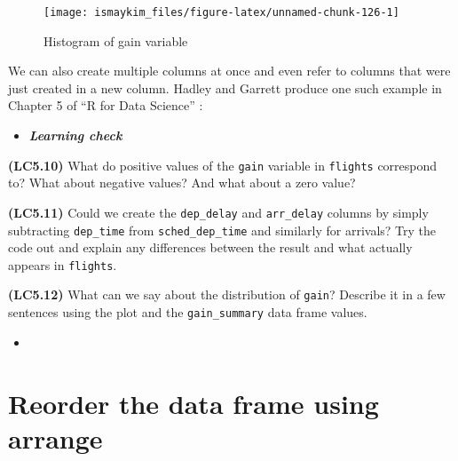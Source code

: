 \documentclass[12pt,]{krantz}
\makeatletter
\newenvironment{Shaded}{\begin{snugshade}}{\end{snugshade}}
\newcommand{\KeywordTok}[1]{\textcolor[rgb]{0.27,0.27,0.27}{\textbf{#1}}}
\newcommand{\DataTypeTok}[1]{\textcolor[rgb]{0.27,0.27,0.27}{#1}}
\newcommand{\DecValTok}[1]{\textcolor[rgb]{0.06,0.06,0.06}{#1}}
\newcommand{\StringTok}[1]{\textcolor[rgb]{0.5,0.5,0.5}{#1}}
\newcommand{\OperatorTok}[1]{\textcolor[rgb]{0.43,0.43,0.43}{\textbf{#1}}}
\newcommand{\NormalTok}[1]{#1}
\newenvironment{kframe}{%
\medskip{}
\setlength{\fboxsep}{.8em}
 \def\at@end@of@kframe{}%
 \ifinner\ifhmode%
  \def\at@end@of@kframe{\end{minipage}}%
  \begin{minipage}{\columnwidth}%
 \fi\fi%
 \def\FrameCommand##1{\hskip\@totalleftmargin \hskip-\fboxsep
 \colorbox{shadecolor}{##1}\hskip-\fboxsep
     \hskip-\linewidth \hskip-\@totalleftmargin \hskip\columnwidth}%
 \MakeFramed {\advance\hsize-\width
   \@totalleftmargin\z@ \linewidth\hsize
   \@setminipage}}%
 {\par\unskip\endMakeFramed%
 \at@end@of@kframe}
\renewenvironment{Shaded}{\begin{kframe}}{\end{kframe}}
\newenvironment{rmdblock}[1]
  {\begin{shaded*}
  \begin{itemize}
  \renewcommand{\labelitemi}{
    \raisebox{-.7\height}[0pt][0pt]{
    }
  }
  \item
  }
  {
  \end{itemize}
  \end{shaded*}
  }
\newenvironment{learncheck}
  {\begin{rmdblock}{warning}}
  {\end{rmdblock}}
\theoremstyle{definition}
\theoremstyle{definition}
\theoremstyle{definition}
\theoremstyle{remark}
\makeatother
\begin{document}
\begin{figure}

{\centering \texttt{[image: ismaykim\_files/figure-latex/unnamed-chunk-126-1]} 

}

\caption{Histogram of gain variable}\label{fig:unnamed-chunk-126}
\end{figure}

We can also create multiple columns at once and even refer to columns
that were just created in a new column. Hadley and Garrett produce one
such example in Chapter 5 of ``R for Data Science'' \citep{rds2016}:

\begin{Shaded}
\end{Shaded}

\begin{learncheck}
\textbf{\emph{Learning check}}
\end{learncheck}

\textbf{(LC5.10)} What do positive values of the \texttt{gain} variable
in \texttt{flights} correspond to? What about negative values? And what
about a zero value?

\textbf{(LC5.11)} Could we create the \texttt{dep\_delay} and
\texttt{arr\_delay} columns by simply subtracting \texttt{dep\_time}
from \texttt{sched\_dep\_time} and similarly for arrivals? Try the code
out and explain any differences between the result and what actually
appears in \texttt{flights}.

\textbf{(LC5.12)} What can we say about the distribution of
\texttt{gain}? Describe it in a few sentences using the plot and the
\texttt{gain\_summary} data frame values.

\begin{learncheck}

\end{learncheck}

\section{Reorder the data frame using arrange}\label{arrange}
\end{document}
